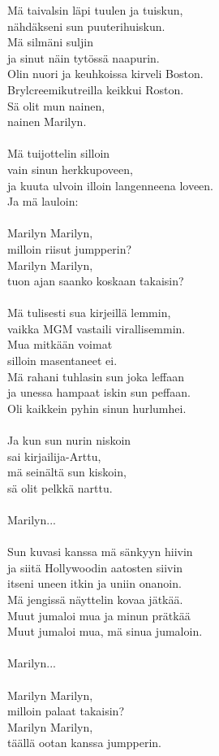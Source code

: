 
Mä taivalsin läpi tuulen ja tuiskun, \\ nähdäkseni sun puuterihuiskun. \\ Mä silmäni suljin \\ ja sinut näin tytössä naapurin. \\ Olin nuori ja keuhkoissa kirveli Boston. \\ Brylcreemikutreilla keikkui Roston. \\ Sä olit mun nainen, \\ nainen Marilyn. \\ \hspace{10mm} \\ Mä tuijottelin silloin \\ vain sinun herkkupoveen, \\ ja kuuta ulvoin illoin langenneena loveen. \\ Ja mä lauloin: \\ \hspace{10mm} \\ Marilyn Marilyn, \\ milloin riisut jumpperin? \\ Marilyn Marilyn, \\ tuon ajan saanko koskaan takaisin? \\ \hspace{10mm} \\ Mä tulisesti sua kirjeillä lemmin, \\ vaikka MGM vastaili virallisemmin. \\ Mua mitkään voimat \\ silloin masentaneet ei. \\ Mä rahani tuhlasin sun joka leffaan \\ ja unessa hampaat iskin sun peffaan. \\ Oli kaikkein pyhin sinun hurlumhei. \\ \hspace{10mm} \\ Ja kun sun nurin niskoin \\ sai kirjailija-Arttu, \\ mä seinältä sun kiskoin, \\ sä olit pelkkä narttu. \\ \hspace{10mm} \\ Marilyn... \\ \hspace{10mm} \\ Sun kuvasi kanssa mä sänkyyn hiivin \\ ja siitä Hollywoodin aatosten siivin \\ itseni uneen itkin ja uniin onanoin. \\ Mä jengissä näyttelin kovaa jätkää. \\ Muut jumaloi mua ja minun prätkää \\ Muut jumaloi mua, mä sinua jumaloin. \\ \hspace{10mm} \\ Marilyn... \\ \hspace{10mm} \\ Marilyn Marilyn, \\ milloin palaat takaisin? \\ Marilyn Marilyn, \\ täällä ootan kanssa jumpperin.